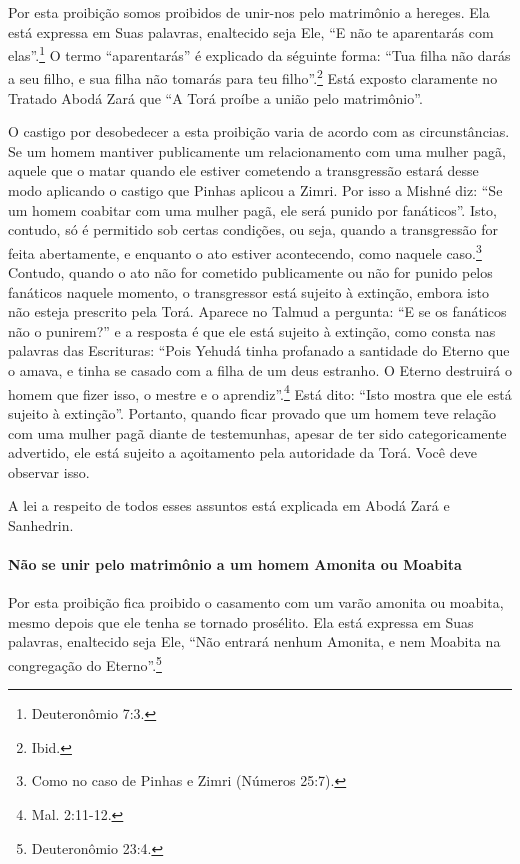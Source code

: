 Por esta proibição somos proibidos de unir-nos pelo matrimônio a
hereges. Ela está expressa em Suas palavras, enaltecido seja Ele, ``E
não te aparentarás com elas''.\footnote{Deuteronômio 7:3.} O termo
``aparentarás'' é explicado da séguinte forma: ``Tua filha não darás a
seu filho, e sua filha não tomarás para teu filho''.\footnote{Ibid.} Está
exposto claramente no Tratado Abodá Zará que ``A Torá proíbe a união
pelo matrimônio''.

O castigo por desobedecer a esta proibição varia de acordo com as
circunstâncias. Se um homem mantiver publicamente um relacionamento com
uma mulher pagã, aquele que o matar quando ele estiver cometendo a
transgressão estará desse modo aplicando o castigo que Pinhas aplicou a
Zimri. Por isso a Mishné diz: ``Se um homem coabitar com uma mulher
pagã, ele será punido por fanáticos''. Isto, contudo, só é permitido
sob certas condições, ou seja, quando a transgressão for feita
abertamente, e enquanto o ato estiver acontecendo, como naquele
caso.\footnote{Como no caso de Pinhas e Zimri (Números 25:7).} Contudo, quando o ato não for cometido
publicamente ou não for punido pelos fanáticos naquele momento, o
transgressor está sujeito à extinção, embora isto não esteja prescrito
pela Torá. Aparece no Talmud a pergunta: ``E se os fanáticos não o
punirem?'' e a resposta é que ele está sujeito à extinção, como consta
nas palavras das Escrituras: ``Pois Yehudá tinha profanado a santidade
do Eterno que o amava, e tinha se casado com a filha de um deus
estranho. O Eterno destruirá o homem que fizer isso, o mestre e o
aprendiz''.\footnote{Mal. 2:11-12.} Está dito: ``Isto mostra que ele está
sujeito à extinção''. Portanto, quando ficar provado que um homem teve
relação com uma mulher pagã diante de testemunhas, apesar de ter sido
categoricamente advertido, ele está sujeito a açoitamento pela
autoridade da Torá. Você deve observar isso.

A lei a respeito de todos esses assuntos está explicada em Abodá Zará e Sanhedrin.

\paragraph{Não se unir pelo matrimônio a um homem Amonita ou Moabita}

Por esta proibição fica proibido o casamento com um varão amonita ou
moabita, mesmo depois que ele tenha se tornado prosélito. Ela está
expressa em Suas palavras, enaltecido seja Ele, ``Não entrará nenhum
Amonita, e nem Moabita na congregação do Eterno''.\footnote{Deuteronômio 23:4.}


